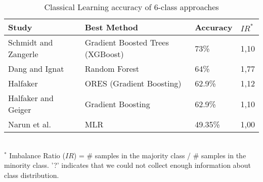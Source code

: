\begin{table}[ht]
    \caption{Classical Learning accuracy of 6-class approaches}
    \label{tab:CL_performance_6class}
    \centering
    \begin{tabular}{l l l l}
        \toprule
        \textbf{Study} & \textbf{Best Method} & \textbf{Accuracy} & \textbf{$IR^*$}\\ 
        \midrule
        Schmidt and Zangerle~\cite{Schmidt2019_lr78} & Gradient Boosted Trees (XGBoost) & 73\% & 1,10 \\
        Dang and Ignat~\cite{Dang2016_lr16} & Random Forest & 64\% & 1,77 \\
        Halfaker~\cite{Halfaker2017_lr22} & ORES (Gradient Boosting) & 62.9\% & 1,12 \\
        Halfaker and Geiger~\cite{Halfaker2020_lr1055} & Gradient Boosting & 62.9\% & 1,10 \\
        Narun et al.~\cite{Raman2020_lr64} & MLR & 49.35\% & 1,00 \\
        \bottomrule
    \end{tabular}
    \\ \vspace{0.1cm}
    \footnotesize
    $^*$ Imbalance Ratio ($IR$) = \# samples in the majority class / \# samples in the minority class. '?' indicates that we could not collect enough information about class distribution.
\end{table}